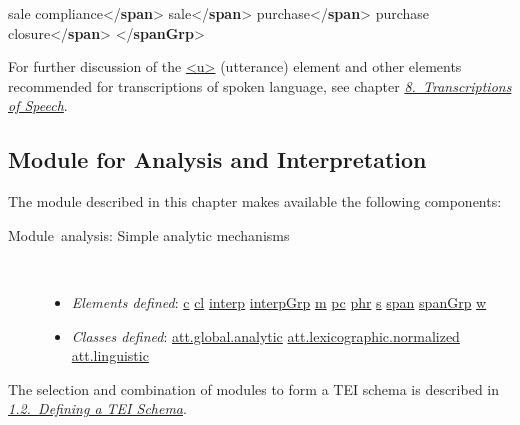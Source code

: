 \begin{shaded}
sale compliance{</\textbf{span}>}\mbox{}\newline 
{}sale{</\textbf{span}>}\mbox{}\newline 
{}purchase{</\textbf{span}>}\mbox{}\newline 
{}purchase closure{</\textbf{span}>}\mbox{}\newline 
{</\textbf{spanGrp}>}\end{shaded}\egroup\par \noindent  For further discussion of the \hyperref[TEI.u]{<u>} (utterance) element and other elements recommended for transcriptions of spoken language, see chapter \textit{\hyperref[TS]{8.\ Transcriptions of Speech}}.
\subsection[{Module for Analysis and Interpretation}]{Module for Analysis and Interpretation}\par
The module described in this chapter makes available the following components: \begin{description}

\item[{Module analysis: Simple analytic mechanisms}]\hspace{1em}\hfill\linebreak
\mbox{}\\[-10pt] \begin{itemize}
\item {\itshape Elements defined}: \hyperref[TEI.c]{c} \hyperref[TEI.cl]{cl} \hyperref[TEI.interp]{interp} \hyperref[TEI.interpGrp]{interpGrp} \hyperref[TEI.m]{m} \hyperref[TEI.pc]{pc} \hyperref[TEI.phr]{phr} \hyperref[TEI.s]{s} \hyperref[TEI.span]{span} \hyperref[TEI.spanGrp]{spanGrp} \hyperref[TEI.w]{w}
\item {\itshape Classes defined}: \hyperref[TEI.att.global.analytic]{att.global.analytic} \hyperref[TEI.att.lexicographic.normalized]{att.lexicographic.normalized} \hyperref[TEI.att.linguistic]{att.linguistic}
\end{itemize} 
\end{description}  The selection and combination of modules to form a TEI schema is described in \textit{\hyperref[STIN]{1.2.\ Defining a TEI Schema}}.